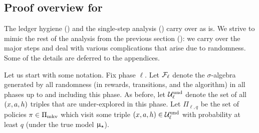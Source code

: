 \subsection{Proof overview for }
\label{sec:probab_proof}




The ledger hygiene () and the single-step analysis () carry over as is. We strive to mimic the rest of the analysis from the previous section (\ie {}): we carry over the major steps and deal with various complications that arise due to randomness. Some of the details are deferred to the appendices.

Let us start with some notation. Fix phase $\ell$. Let $\mathcal{F}_{\ell}$ denote the $\sigma$-algebra generated by all randomness (in rewards, transitions, and the algorithm) in all phases up to and including this phase.  As before, let $\mathcal{U}^{\mathrm{und}}_{\ell}$ denote the set of all $(x,a,h)$ triples that are under-explored in this phase. Let $\Pi_{\ell,q}$ be the set of policies $\pi\in \Pi_{\mathrm{mkv}}$ which visit some triple $(x,a,h)\in \mathcal{U}^{\mathrm{und}}_{\ell}$ with probability at least $q$ (under the true model $\upmu_{\star}$).


